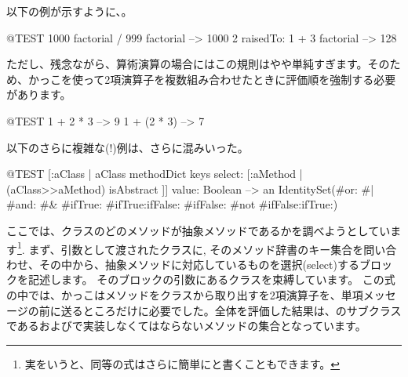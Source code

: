 \documentclass[a4paper,10pt,twoside]{book}
\begin{document}

以下の例が示すように、。
\begin{code}{@TEST}
1000 factorial / 999 factorial --> 1000
2 raisedTo: 1 + 3 factorial     --> 128
\end{code}
\noindent

ただし、残念ながら、算術演算の場合にはこの規則はやや単純すぎます。そのため、かっこを使って2項演算子を複数組み合わせたときに評価順を強制する必要があります。
\begin{code}{@TEST}
1 + 2 * 3   --> 9
1 + (2 * 3) --> 7
\end{code}

以下のさらに複雑な(!)例は、さらに混みいった。
\begin{code}{@TEST}
[:aClass | aClass methodDict keys select: [:aMethod | (aClass>>aMethod) isAbstract ]] value: Boolean --> an IdentitySet(#or: #| #and: #& #ifTrue: #ifTrue:ifFalse: #ifFalse: #not #ifFalse:ifTrue:)
\end{code}
\noindent
ここでは、クラスのどのメソッドが抽象メソッドであるかを調べようとしています\footnote{実をいうと、同等の式はさらに簡単にと書くこともできます。}.
まず、引数として渡されたクラスに, そのメソッド辞書のキー集合を問い合わせ、その中から、抽象メソッドに対応しているものを選択(select)するブロックを記述します。
そのブロックの引数にあるクラスを束縛しています。
この式の中では、かっこはメソッドをクラスから取り出すを2項演算子\ct{>>}を、単項メッセージ\mbox{}の前に送るところだけに必要でした。全体を評価した結果は、のサブクラスであるおよびで実装しなくてはならないメソッドの集合となっています。


\end{document}
